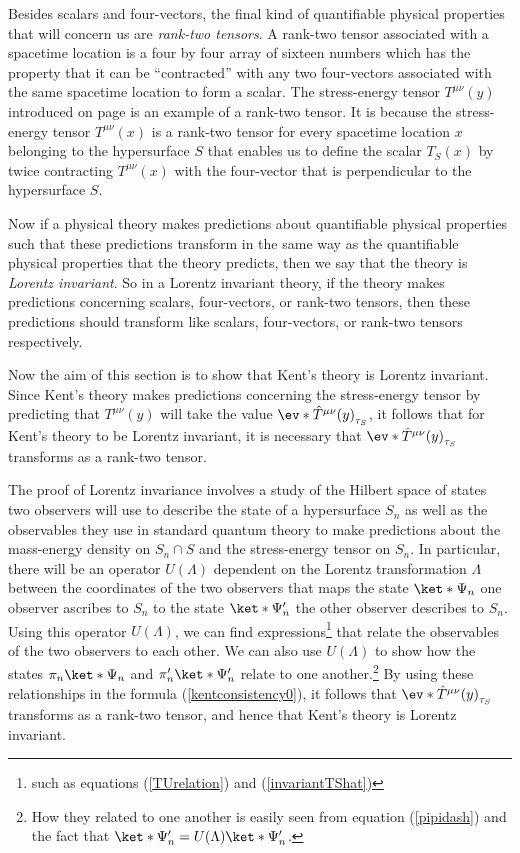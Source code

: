 \documentclass[12pt]{report}
\begin{document}
Besides scalars and four-vectors, the final kind of quantifiable physical properties that will concern us are \emph{rank-two tensors}. A rank-two tensor associated with a spacetime location is a four by four array of sixteen numbers which has the property that it can be ``contracted'' with any two four-vectors associated with the same spacetime location to form a scalar. The stress-energy tensor $T^{\mu\nu}(y)$ introduced on page \pageref{stressenergy} is an example of a rank-two tensor. It is because the stress-energy tensor $T^{\mu\nu}(x)$ is a rank-two tensor for every spacetime location $x$ belonging to the hypersurface $S$ that enables us to define the scalar $T_S(x)$ by twice contracting $T^{\mu\nu}(x)$ with the four-vector that is perpendicular to the hypersurface $S$.

Now if a physical theory makes predictions about quantifiable physical properties such that these predictions transform in the same way as the quantifiable physical properties that the theory predicts, then we say that the theory is \emph{Lorentz invariant}. So in a Lorentz invariant theory, if the theory makes predictions concerning scalars, four-vectors, or rank-two tensors,  then these predictions should transform like scalars, four-vectors, or rank-two tensors respectively. 

Now the aim of this section is to show that Kent's theory is Lorentz invariant. Since Kent's theory makes predictions concerning the stress-energy tensor by predicting that ${T^{\mu\nu}(y)}$ will take the value $\ev*{\hat{T}^{\mu\nu}(y)}_{\tau_S}$, it follows that for Kent's theory to be Lorentz invariant, it is necessary that  $\ev*{\hat{T}^{\mu\nu}(y)}_{\tau_S}$ transforms as a rank-two tensor. 

The proof of Lorentz invariance involves a study of the Hilbert space of states two observers will use to describe the state of a hypersurface $S_n$ as well as the observables they use in standard quantum theory to make predictions about the mass-energy density on  $S_n\cap S$ and the stress-energy tensor on $S_n$. In particular, there will be an operator $U(\Lambda)$ dependent on the Lorentz transformation $\Lambda$ between the coordinates of the two observers that maps the state $\ket*{\Psi_n}$ one observer ascribes to $S_n$ to the state $\ket*{\Psi_n'}$ the other observer describes to $S_n$. Using this operator $U(\Lambda)$, we can find expressions\footnote{such as equations (\ref{TUrelation}) and (\ref{invariantTShat})} that relate the observables of the two observers to each other. We can also use $U(\Lambda)$ to show how the states $\pi_n\ket*{\Psi_n}$ and $\pi_n'\ket*{\Psi_n'}$ relate to one another.\footnote{How they related to one another is easily seen from equation (\ref{pipidash}) and the fact that $\ket*{\Psi_n'}=U(\Lambda)\ket*{\Psi_n'}$.} By using these relationships in the formula (\ref{kentconsistency0}), it follows that $\ev*{\hat{T}^{\mu\nu}(y)}_{\tau_S}$ transforms as a rank-two tensor, and hence that Kent's theory is Lorentz invariant.
\end{document}
